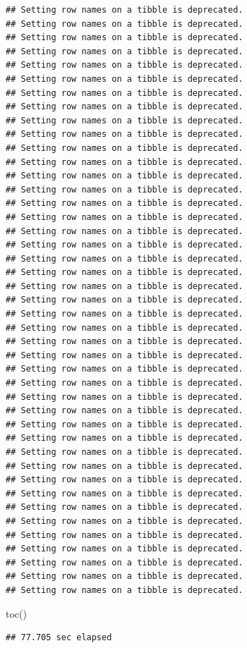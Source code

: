 \documentclass[
]{article}
\newenvironment{Shaded}{\begin{snugshade}}{\end{snugshade}}
\newcommand{\FunctionTok}[1]{\textcolor[rgb]{0.00,0.00,0.00}{#1}}
\newcommand{\NormalTok}[1]{#1}
\begin{document}
\begin{verbatim}
## Setting row names on a tibble is deprecated.
## Setting row names on a tibble is deprecated.
## Setting row names on a tibble is deprecated.
## Setting row names on a tibble is deprecated.
## Setting row names on a tibble is deprecated.
## Setting row names on a tibble is deprecated.
## Setting row names on a tibble is deprecated.
## Setting row names on a tibble is deprecated.
## Setting row names on a tibble is deprecated.
## Setting row names on a tibble is deprecated.
## Setting row names on a tibble is deprecated.
## Setting row names on a tibble is deprecated.
## Setting row names on a tibble is deprecated.
## Setting row names on a tibble is deprecated.
## Setting row names on a tibble is deprecated.
## Setting row names on a tibble is deprecated.
## Setting row names on a tibble is deprecated.
## Setting row names on a tibble is deprecated.
## Setting row names on a tibble is deprecated.
## Setting row names on a tibble is deprecated.
## Setting row names on a tibble is deprecated.
## Setting row names on a tibble is deprecated.
## Setting row names on a tibble is deprecated.
## Setting row names on a tibble is deprecated.
## Setting row names on a tibble is deprecated.
## Setting row names on a tibble is deprecated.
## Setting row names on a tibble is deprecated.
## Setting row names on a tibble is deprecated.
## Setting row names on a tibble is deprecated.
## Setting row names on a tibble is deprecated.
## Setting row names on a tibble is deprecated.
## Setting row names on a tibble is deprecated.
## Setting row names on a tibble is deprecated.
## Setting row names on a tibble is deprecated.
## Setting row names on a tibble is deprecated.
## Setting row names on a tibble is deprecated.
## Setting row names on a tibble is deprecated.
## Setting row names on a tibble is deprecated.
## Setting row names on a tibble is deprecated.
## Setting row names on a tibble is deprecated.
## Setting row names on a tibble is deprecated.
## Setting row names on a tibble is deprecated.
## Setting row names on a tibble is deprecated.
\end{verbatim}

\begin{Shaded}
\begin{Highlighting}[]
\FunctionTok{toc}\NormalTok{()}
\end{Highlighting}
\end{Shaded}

\begin{verbatim}
## 77.705 sec elapsed
\end{verbatim}
\end{document}

